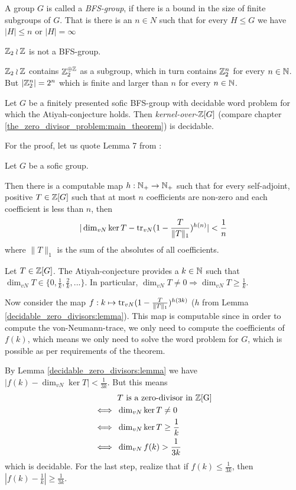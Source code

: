 \begin{Definition}
	A group $G$ is called a \emph{BFS-group}, if there is a bound in the size of finite subgroups of $G$.
	That is there is an $n \in N$ such that for every $H \leq G$ we have $|H| \leq n$ or $|H| = \infty$
\end{Definition}

\begin{Example}
	$\mathbb{Z}_2 \wr \mathbb{Z}$ is not a BFS-group.
\end{Example}
\proof
	$\mathbb{Z}_2 \wr \mathbb{Z}$ contains $\mathbb{Z}_2^{\oplus \mathbb{Z}}$ as a subgroup, which in turn contains $\mathbb{Z}_2^n$ for every $n \in \mathbb{N}$. But $|\mathbb{Z}_2^n| = 2^n$ which is finite and larger than $n$ for every $n \in \mathbb{N}$.
\endproof

\begin{Theorem}
	\label{decidable_zero_divisors:theorem}
	Let $G$ be a finitely presented sofic BFS-group with decidable word problem for which the Atiyah-conjecture holds.%
	Then \emph{kernel-over-$\mathbb{Z}[G]$} (compare chapter \ref{the_zero_divisor_problem:main_theorem}) is decidable.
\end{Theorem}
For the proof, let us quote Lemma 7 from \cite{gra14-2}:
\begin{Lemma}
		\label{decidable_zero_divisors:lemma}
	Let $G$ be a sofic group.

	Then there is a computable map $h: \mathbb{N}_+ \to \mathbb{N}_+$ such that for every self-adjoint, positive $T \in \mathbb{Z}[G]$ such that at most $n$ coefficients are non-zero and each coefficient is less than $n$, then
	\begin{align*}
		| \dim_{vN} \ker T - \operatorname{tr}_{vN}(1 - \frac{T}{\|T\|_1})^{h(n)} | < \frac{1}{n}
	\end{align*}
	where $\|T\|_1$ is the sum of the absolutes of all coefficients.
\end{Lemma}
	Let $T \in \mathbb{Z}[G]$.
	The Atiyah-conjecture provides a $k \in \mathbb{N}$ such that $\dim_{vN} T \in \{0, \frac{1}{k},\frac{2}{k},...\}$. %
	In particular, $\dim_{vN} T \neq 0 \Rightarrow \dim_{vN} T \geq \frac1k$.

	Now consider the map $f:k \mapsto \operatorname{tr}_{vN}(1 - \frac{T}{\|T\|_1})^{h(3k)}$ ($h$ from Lemma \ref{decidable_zero_divisors:lemma}).
	This map is computable since in order to compute the von-Neumann-trace, we only need to compute the coefficients of $f(k)$, which means we only need to solve the word problem for $G$, which is possible as per requirements of the theorem.

	By Lemma \ref{decidable_zero_divisors:lemma} we have $|f(k) - \dim_{vN} \ker T| < \frac{1}{3k}$. But this means
	\begin{align*}
		&T ~\text{is a zero-divisor in \ensuremath{\mathbb{Z}}[G]} \\
		\iff~& \dim_{vN} \ker T \neq 0 \\
		\iff~& \dim_{vN} \ker T \geq \frac1k \\
		\iff~& \dim_{vN} f(k) > \frac{1}{3k}
	\end{align*}
	which is decidable. For the last step, realize that if $f(k) \leq \frac{1}{3k}$, then $|f(k) - \frac1k| \geq \frac{1}{3k}$.
\endproof
